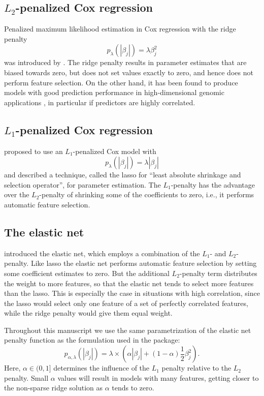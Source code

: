 \documentclass[nojss]{jss}
\begin{document}
\subsection{$L_2$-penalized Cox regression}
Penalized maximum likelihood estimation in Cox regression with the ridge penalty
\begin{equation}\label{ridge}
p_{\lambda}(|\beta_j|)=\lambda\beta_j^2
\end{equation}
was introduced by \citet{verweij94}.
The ridge penalty results in parameter estimates that are biased towards zero, but does not set values exactly to zero, and hence does not perform feature selection.
On the other hand, it has been found to produce models with good prediction performance in high-dimensional genomic applications \citep[e.g.,][]{bovelstad07}, in particular if predictors are highly correlated.

\subsection{$L_1$-penalized Cox regression}
 proposed to use an $L_1$-penalized Cox model with
\begin{equation}
p_{\lambda}(|\beta_j|)=\lambda | \beta_j |
\end{equation}
and described a technique, called the lasso for ``least absolute shrinkage and selection operator'', for parameter estimation.
The $L_1$-penalty has the advantage over the $L_2$-penalty of shrinking some of the coefficients to zero, i.e., it performs automatic feature selection.

\subsection{The elastic net}
 introduced the elastic net, which employs a combination of the $L_1$- and $L_2$-penalty. Like lasso the elastic net performs automatic feature selection by setting some coefficient estimates to zero.
But the additional $L_2$-penalty term distributes the weight to more features, so that the elastic net tends to select more features than the lasso. 
This is especially the case in situations with high correlation, since the lasso would select only one feature of a set of perfectly correlated features, while the ridge penalty would give them equal weight.

Throughout this manuscript we use the same parametrization of the elastic net penalty function as the formulation used in the  package:
  \begin{equation}\label{enet2}
p_{\alpha,\lambda}(|\beta_j|)= \lambda\times (\alpha |\beta_j| + (1-\alpha)\frac{1}{2} \beta_j^2).
\end{equation}
Here, $\alpha \in (0,1]$ determines the influence of the $L_1$ penalty relative to the $L_2$ penalty. Small $\alpha$ values will result in models with many features, getting closer to the non-sparse ridge solution as $\alpha$ tends to zero.
\end{document}

